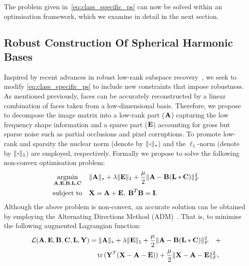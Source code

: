 The problem given in~\eqref{eq:class_specific_ps} can now be solved within an
optimisation framework, which we examine in detail in the next section.
\subsection{Robust Construction Of Spherical Harmonic Bases}\label{subsec:robust_sh_basis}
Inspired by recent advances in robust low-rank subspace
recovery~\cite{RefWorks:321}, we seek to modify \cref{eq:class_specific_ps} to
include new constraints that impose robustness. As mentioned previously, faces
can be accurately reconstructed by a linear combination of faces taken from a
low-dimensional basis. Therefore, we propose to decompose the image matrix into
a low-rank part ($\boldsymbol{\mathbf{A}}$) capturing the low frequency shape information and a
sparse part ($\boldsymbol{\mathbf{E}}$) accounting for gross but sparse noise such as partial
occlusions and pixel corruptions. To promote low-rank and sparsity the nuclear
norm (denote by $\lVert \boldsymbol{\mathbf{\cdot}} \rVert_{*}$) and the $\ell_1$-norm (denote by
$\lVert \boldsymbol{\mathbf{\cdot}} \rVert_{1}$) are employed, respectively. Formally we propose
to solve the following non-convex optimisation problem:
\begin{equation}
\begin{aligned}
    &\argmin_{\bb{A},\bb{E},\bb{B},\bb{L},\bb{C}} & &\lVert \bb{A} \rVert_{*} + \lambda \lVert \bb{E} \rVert_{1} + \frac{\mu}{2} \lVert \bb{A} - \bb{B} (\bb{L} \ast \bb{C}) \rVert^{2}_{F} \\
    & \text{subject to} & & \bb{X} = \bb{A} + \bb{E}, \; \bb{B}^T \bb{B} = \bb{I}.
\end{aligned}
\label{eq:robust_sh_problem}
\end{equation}
Although the above problem is non-convex, an accurate solution can be obtained
by employing the Alternating Directions Method (ADM)~\cite{Bertsekas1982}. That
is, to minimise the following augmented Lagrangian function:
\begin{equation}
    \begin{aligned}
        \mathcal{L}(\boldsymbol{\mathbf{A}},\boldsymbol{\mathbf{E}},\boldsymbol{\mathbf{B}},\boldsymbol{\mathbf{C}},\boldsymbol{\mathbf{L}},\boldsymbol{\mathbf{Y}}) &= \lVert \boldsymbol{\mathbf{A}} \rVert_{*} + \lambda \lVert \boldsymbol{\mathbf{E}} \rVert_{1} + \frac{\mu}{2} \lVert \boldsymbol{\mathbf{A}} - \boldsymbol{\mathbf{B}} (\boldsymbol{\mathbf{L}} \ast \boldsymbol{\mathbf{C}}) \rVert^{2}_{F} \quad + \\
        & \quad \operatorname{tr}{(\boldsymbol{\mathbf{Y}}^T(\boldsymbol{\mathbf{X}} - \boldsymbol{\mathbf{A}} - \boldsymbol{\mathbf{E}}))} +  \frac{\mu}{2} \lVert \boldsymbol{\mathbf{X}} - \boldsymbol{\mathbf{A}} - \boldsymbol{\mathbf{E}} \rVert_{F}^{2},
    \end{aligned}\label{eq:augmented_lagrangian}
\end{equation}
